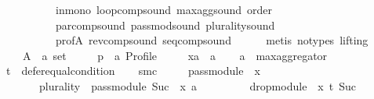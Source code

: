 \begin{isabellebody}
\ \ \ \ \ \ \ \ \ \ in{\isacharunderscore}{\kern0pt}mono\ loop{\isacharunderscore}{\kern0pt}comp{\isacharunderscore}{\kern0pt}sound\ max{\isacharunderscore}{\kern0pt}agg{\isacharunderscore}{\kern0pt}sound\ order\isanewline
\ \ \ \ \ \ \ \ \ \ par{\isacharunderscore}{\kern0pt}comp{\isacharunderscore}{\kern0pt}sound\ pass{\isacharunderscore}{\kern0pt}mod{\isacharunderscore}{\kern0pt}sound\ plurality{\isacharunderscore}{\kern0pt}sound\isanewline
\ \ \ \ \ \ \ \ \ \ prof{\isacharunderscore}{\kern0pt}A\ rev{\isacharunderscore}{\kern0pt}comp{\isacharunderscore}{\kern0pt}sound\ seq{\isacharunderscore}{\kern0pt}comp{\isacharunderscore}{\kern0pt}sound\isanewline
\ \ \ \ \isamarkupfalse%
\ {\isacharparenleft}{\kern0pt}metis\ {\isacharparenleft}{\kern0pt}no{\isacharunderscore}{\kern0pt}types{\isacharcomma}{\kern0pt}\ lifting{\isacharparenright}{\kern0pt}{\isacharparenright}{\kern0pt}\isanewline
{}\isamarkupfalse%
\isanewline
\ \ \isamarkupfalse%
\isanewline
\ \ \ \ A\ {\isacharcolon}{\kern0pt}{\isacharcolon}{\kern0pt}\ {\isachardoublequoteopen}{\isacharprime}{\kern0pt}a\ set{\isachardoublequoteclose}\ \isanewline
\ \ \ \ p\ {\isacharcolon}{\kern0pt}{\isacharcolon}{\kern0pt}\ {\isachardoublequoteopen}{\isacharprime}{\kern0pt}a\ Profile{\isachardoublequoteclose}\ \isanewline
\ \ \ \ xa\ {\isacharcolon}{\kern0pt}{\isacharcolon}{\kern0pt}\ {\isachardoublequoteopen}{\isacharprime}{\kern0pt}a{\isachardoublequoteclose}\isanewline
\ \ \isamarkupfalse%
\ {\isacharquery}{\kern0pt}a\ {\isacharequal}{\kern0pt}\ {\isachardoublequoteopen}max{\isacharunderscore}{\kern0pt}aggregator{\isachardoublequoteclose}\isanewline
\ \ \isamarkupfalse%
\ {\isacharquery}{\kern0pt}t\ {\isacharequal}{\kern0pt}\ {\isachardoublequoteopen}defer{\isacharunderscore}{\kern0pt}equal{\isacharunderscore}{\kern0pt}condition{\isachardoublequoteclose}\isanewline
\ \ \isamarkupfalse%
\ {\isacharquery}{\kern0pt}smc\ {\isacharequal}{\kern0pt}\isanewline
\ \ \ \ {\isachardoublequoteopen}pass{\isacharunderscore}{\kern0pt}module\ {}\ x\ {\isasymtriangleright}\isanewline
\ \ \ \ \ \ \ {\isacharparenleft}{\kern0pt}{\isacharparenleft}{\kern0pt}plurality{\isasymdown}{\isacharparenright}{\kern0pt}\ {\isasymtriangleright}\ pass{\isacharunderscore}{\kern0pt}module\ {\isacharparenleft}{\kern0pt}Suc\ {}{\isacharparenright}{\kern0pt}\ x{\isacharparenright}{\kern0pt}\ {\isasymparallel}\isactrlsub {\isacharquery}{\kern0pt}a\isanewline
\ \ \ \ \ \ \ \ \ drop{\isacharunderscore}{\kern0pt}module\ {}\ x\ {\isasymcirclearrowleft}\isactrlsub {\isacharquery}{\kern0pt}t\ {\isacharparenleft}{\kern0pt}Suc\ {}{\isacharparenright}{\kern0pt}{\isachardoublequoteclose}\isanewline

\end{isabellebody}
